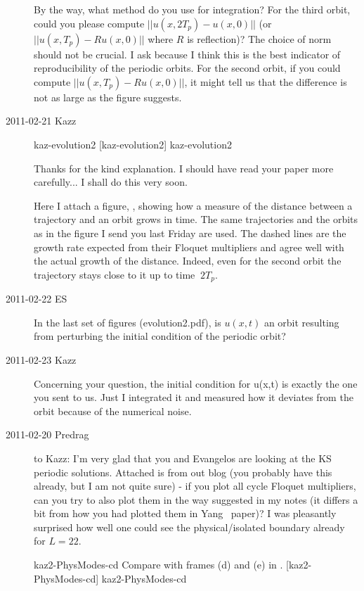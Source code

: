 \begin{description}
By the way, what method do you use for integration? For the third
orbit, could you please compute $||u(x,2T_p)-u(x,0)||$ (or
$||u(x,T_p)-Ru(x,0)||$ where $R$ is reflection)? The choice of norm should
not be crucial. I ask because I think this is the best indicator of
reproducibility of the periodic orbits. For the second orbit, if you
could compute $||u(x,T_p)-Ru(x,0)||$, it might tell us that the
difference is not as large as the figure suggests.

\item[2011-02-21 Kazz]

{kaz-evolution2}   %
{}   %
{    %
{\po}  [kaz-evolution2]
}
{kaz-evolution2}   %


Thanks for the kind explanation. I should have read your
paper more carefully... I shall do this very soon.

Here I attach a figure, , showing
how a measure of the distance between a
trajectory and an orbit grows in time. The same trajectories and the orbits
as in the figure I send you last Friday are used. The dashed lines are the
growth rate expected from their Floquet multipliers and agree well with the
actual growth of the distance. Indeed, even for the second orbit the trajectory
stays close to it up to time $~2T_p$.

\item[2011-02-22 ES] In the last set of figures (evolution2.pdf), is $u(x,t)$
an orbit resulting from perturbing the initial condition of the periodic orbit?

\item[2011-02-23 Kazz] Concerning your question, the initial condition for u(x,t)
is exactly the one you sent to us. Just I integrated it and measured how
it deviates from the orbit because of the numerical noise.


\item[2011-02-20 Predrag] to Kazz:
I'm very glad that you and Evangelos are looking at the KS periodic solutions.
Attached is  from out blog
(you probably have this already, but
I am not quite sure) - if you plot all cycle Floquet multipliers, can you try to
also plot them in the way suggested in my notes (it differs a bit from how you
had plotted them in Yang \etal\ paper)?
I was pleasantly surprised how well one
could see the physical/isolated boundary already for $L=22$.


{kaz2-PhysModes-cd}   %
{}   %
{    %
Compare with frames (d) and (e) in .
{\po}  [kaz2-PhysModes-cd]
}
{kaz2-PhysModes-cd}   %


\end{description}
